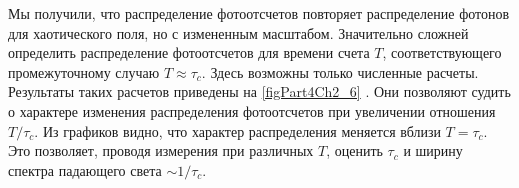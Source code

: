 Мы получили, что распределение фотоотсчетов повторяет распределение
фотонов для хаотического поля, но с измененным масштабом. Значительно
сложней определить распределение фотоотсчетов для времени счета $T$,
соответствующего промежуточному случаю $T \approx \tau_c$.  Здесь
возможны только численные расчеты. Результаты таких расчетов приведены
на \autoref{figPart4Ch2_6} \cite{bLoudon1976}. Они позволяют судить о характере
изменения распределения фотоотсчетов при увеличении отношения
$T/\tau_c$.  Из графиков видно, что характер распределения меняется
вблизи $T = \tau_c$.  Это позволяет, проводя измерения при различных
$T$,  оценить $\tau_c$ и ширину спектра падающего 
света $\sim 1/\tau_c$. 


